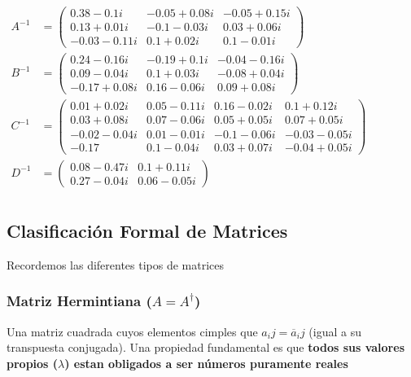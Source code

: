 \documentclass[11pt]{article}
\begin{document}
    $\displaystyle 
\begin{aligned}
A^{-1} &= \begin{pmatrix} 0.38 - 0.1i & -0.05 + 0.08i & -0.05 + 0.15i \\ 0.13 + 0.01i & -0.1 - 0.03i & 0.03 + 0.06i \\ -0.03 - 0.11i & 0.1 + 0.02i & 0.1 - 0.01i \end{pmatrix} \\[1em] B^{-1} &= \begin{pmatrix} 0.24 - 0.16i & -0.19 + 0.1i & -0.04 - 0.16i \\ 0.09 - 0.04i & 0.1 + 0.03i & -0.08 + 0.04i \\ -0.17 + 0.08i & 0.16 - 0.06i & 0.09 + 0.08i \end{pmatrix} \\[1em] C^{-1} &= \begin{pmatrix} 0.01 + 0.02i & 0.05 - 0.11i & 0.16 - 0.02i & 0.1 + 0.12i \\ 0.03 + 0.08i & 0.07 - 0.06i & 0.05 + 0.05i & 0.07 + 0.05i \\ -0.02 - 0.04i & 0.01 - 0.01i & -0.1 - 0.06i & -0.03 - 0.05i \\ -0.17 & 0.1 - 0.04i & 0.03 + 0.07i & -0.04 + 0.05i \end{pmatrix} \\[1em] D^{-1} &= \begin{pmatrix} 0.08 - 0.47i & 0.1 + 0.11i \\ 0.27 - 0.04i & 0.06 - 0.05i \end{pmatrix} \\[1em]
\end{aligned}
$

    
    \subsection{Clasificación Formal de
Matrices}\label{clasificaciuxf3n-formal-de-matrices}

Recordemos las diferentes tipos de matrices

\subsubsection{\texorpdfstring{Matriz Hermintiana
(\(A = A^\dagger\))}{Matriz Hermintiana (A = A\^{}\textbackslash dagger)}}\label{matriz-hermintiana-a-adagger}

Una matriz cuadrada cuyos elementos cimples que
\(a_ij = \overline a_ij\) (igual a su transpuesta conjugada). Una
propiedad fundamental es que \textbf{todos sus valores propios
(\(\lambda\)) estan obligados a ser números puramente reales}
\end{document}
